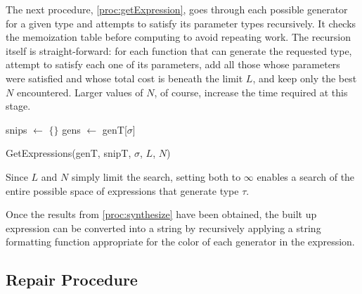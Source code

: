 The next procedure, \ref{proc:getExpression}, goes through each possible generator for a given type and attempts to satisfy its parameter types recursively. It checks the memoization table before computing to avoid repeating work. The recursion itself is straight-forward: for each function that can generate the requested type, attempt to satisfy each one of its parameters, add all those whose parameters were satisfied and whose total cost is beneath the limit $L$, and keep only the best $N$ encountered. Larger values of $N$, of course, increase the time required at this stage.
\begin{procedure}
snips $\leftarrow$ $\{\}$ \;
gens $\leftarrow$ genT[$\sigma$] \;
\caption{GetExpressions(genT, snipT, $\sigma$, $L$, $N$)}
\label{proc:getExpression}
\end{procedure}
Since $L$ and $N$ simply limit the search, setting both to $\infty$ enables a search of the entire possible space of expressions that generate type $\tau$.

Once the results from \ref{proc:synthesize} have been obtained, the built up expression can be converted into a string by recursively applying a string formatting function appropriate for the color of each generator in the expression.

\subsection{Repair Procedure}


\lipsum[1-36]
